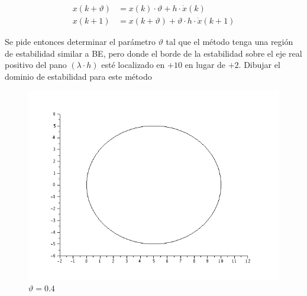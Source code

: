\documentclass{article}
\begin{document}
\begin{itemize}
\begin{align}
	x(k+\vartheta) &= x(k) \cdot \vartheta + h \cdot \dot{x}(k) \tag{P2.7a} \\
	x(k+1)   &= x(k + \vartheta) + \vartheta \cdot h \cdot \dot{x}(k+1) \tag{P2.7b}
\end{align}


Se pide entonces determinar el parámetro $\vartheta$ tal que el método tenga una región de estabilidad similar a BE, pero donde el borde de la estabilidad sobre el eje real positivo del pano $(\lambda \cdot h)$ esté localizado en $+10$ en lugar de $+2$.
Dibujar el dominio de estabilidad para este método

\begin{figure}[H]
\includegraphics[width=\textwidth]{img/ej7.png}
\caption{$\vartheta = 0.4$}
\end{figure}



\end{itemize}
\end{document}
